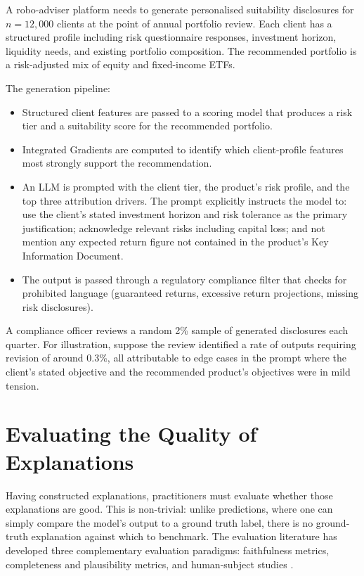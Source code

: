 \begin{example}
\label{ex:mifid-disclosure}
A robo-adviser platform needs to generate personalised suitability disclosures for
$n = 12{,}000$ clients at the point of annual portfolio review. Each client has a
structured profile including risk questionnaire responses, investment horizon, liquidity
needs, and existing portfolio composition. The recommended portfolio is a risk-adjusted
mix of equity and fixed-income ETFs.

The generation pipeline:
\begin{itemize}
  \item Structured client features are passed to a scoring model that produces a risk
        tier and a suitability score for the recommended portfolio.
  \item Integrated Gradients are computed to identify which client-profile features most
        strongly support the recommendation.
  \item An LLM is prompted with the client tier, the product's risk profile, and the top
        three attribution drivers. The prompt explicitly instructs the model to: use the
        client's stated investment horizon and risk tolerance as the primary justification;
        acknowledge relevant risks including capital loss; and not mention any expected
        return figure not contained in the product's Key Information Document.
  \item The output is passed through a regulatory compliance filter that checks for
        prohibited language (guaranteed returns, excessive return projections, missing risk
        disclosures).
\end{itemize}

A compliance officer reviews a random 2\% sample of generated disclosures each quarter.
For illustration, suppose the review identified a rate of outputs requiring revision of around 0.3\%,
all attributable to edge cases in the prompt where the client's stated
objective and the recommended product's objectives were in mild tension.
\end{example}

\section{Evaluating the Quality of Explanations}
\label{sec:ch12-evaluating-quality}

Having constructed explanations, practitioners must evaluate whether those explanations
are good. This is non-trivial: unlike predictions, where one can simply compare the
model's output to a ground truth label, there is no ground-truth explanation against
which to benchmark. The evaluation literature has developed three complementary
evaluation paradigms: faithfulness metrics, completeness and plausibility metrics, and
human-subject studies \cite{nauta2023anecdotal}.


